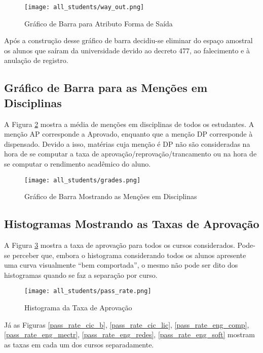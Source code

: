 \begin{figure}[!ht]
    \caption{Gráfico de Barra para Atributo Forma de Saída}
    \centering
    \texttt{[image: all\_students/way\_out.png]}
    \label{atr_way_out}
\end{figure}

Após a construção desse gráfico de barra decidiu-se eliminar do espaço amostral os
alunos que saíram da universidade devido ao decreto 477, ao falecimento e à anulação
de registro. 

\subsection{Gráfico de Barra para as Menções em Disciplinas}
A Figura \ref{avg_grades} mostra a média de menções em disciplinas de todos os
estudantes. A menção AP corresponde a Aprovado, enquanto que a menção DP corresponde
à dispensado. Devido a isso, matérias cuja menção é DP não são consideradas na hora
de se computar a taxa de aprovação/reprovação/trancamento ou na hora de se computar o
rendimento acadêmico do aluno. 

\begin{figure}[!ht]
    \caption{Gráfico de Barra Mostrando as Menções em Disciplinas}
    \centering
    \texttt{[image: all\_students/grades.png]}
    \label{avg_grades}
\end{figure}
\clearpage

\subsection{Histogramas Mostrando as Taxas de Aprovação}
A Figura \ref{pass_rate_all} mostra a taxa de aprovação para todos os cursos
considerados. 
Pode-se perceber que, embora o histograma considerando todos os alunos apresente uma
curva visualmente ``bem comportada'', o mesmo não pode ser dito dos histogramas
quando se faz a separação por curso.  

\begin{figure}[!ht]
    \caption{Histograma da Taxa de Aprovação}
    \centering
    \texttt{[image: all\_students/pass\_rate.png]}
    \label{pass_rate_all}
\end{figure}

Já as Figuras \ref{pass_rate_cic_b}, \ref{pass_rate_cic_lic},
\ref{pass_rate_eng_comp}, \ref{pass_rate_eng_mectr}, \ref{pass_rate_eng_redes},
\ref{pass_rate_eng_soft} mostram as taxas em cada um dos cursos separadamente. 

